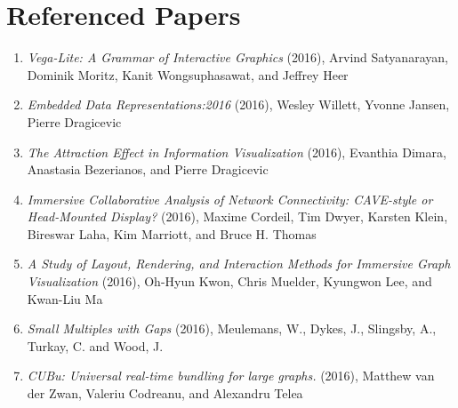 \documentclass[journal]{vgtc}                %
\begin{document}
\section{Referenced Papers}
    \begin{enumerate}
        \item{\textit{Vega-Lite: A Grammar of Interactive Graphics} (2016), Arvind Satyanarayan, Dominik Moritz, Kanit Wongsuphasawat, and Jeffrey Heer \cite{VegaLite:2016}}
        \item{\textit{Embedded Data Representations:2016} (2016), Wesley Willett, Yvonne Jansen, Pierre Dragicevic \cite{EmbeddedDataRepresentations:2016}}
        \item{\textit{The Attraction Effect in Information Visualization} (2016), Evanthia Dimara, Anastasia Bezerianos, and Pierre Dragicevic \cite{AttractionEffect:2016}}
        \item{\textit{Immersive Collaborative Analysis of Network Connectivity: CAVE-style or Head-Mounted Display?} (2016), Maxime Cordeil{,} Tim Dwyer{,} Karsten Klein{,} Bireswar Laha{,} Kim Marriott{,} and Bruce H. Thomas \cite{NetworkConnectivityAnalysis:2016}}
        \item{\textit{A Study of Layout, Rendering, and Interaction Methods for Immersive Graph Visualization} (2016), Oh-Hyun Kwon{,} Chris Muelder{,} Kyungwon Lee{,} and Kwan-Liu Ma \cite{ImmersiveGraphVisualization:2016}}
        \item{\textit{Small Multiples with Gaps} (2016), Meulemans{,} W.{,} Dykes{,} J.{,} Slingsby{,} A.{,} Turkay{,} C. and Wood{,} J. \cite{SmallMultiples:2016}}
        \item{\textit{CUBu: Universal real-time bundling for large graphs.} (2016), Matthew van der Zwan{,} Valeriu Codreanu{,} and Alexandru Telea \cite{CUBu:2016}}
    \end{enumerate}




\nocite{*}
%
%
%

%


\end{document}
